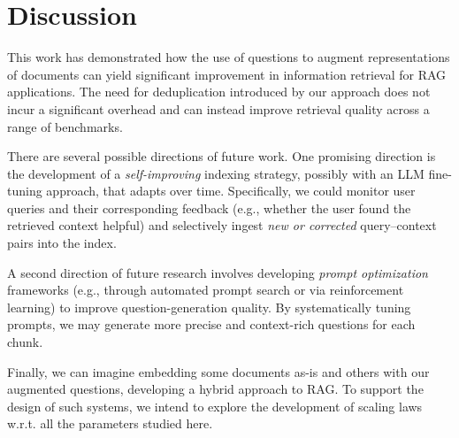 \section{Discussion}
\label{sec:discussion}
This work has demonstrated how the use of questions to augment representations of documents can yield significant improvement in information retrieval for RAG applications. The need for deduplication introduced by our approach does not incur a significant overhead and can instead improve retrieval quality across a range of benchmarks. 

There are several possible directions of future work. One promising direction is the development of a \emph{self-improving} indexing strategy, possibly with an LLM fine-tuning approach, that adapts over time. 
Specifically, we could monitor user queries and their corresponding feedback (e.g., whether the user found the retrieved context helpful) and selectively ingest \emph{new or corrected} query--context pairs into the index. 

A second direction of future research involves developing \emph{prompt optimization} frameworks (e.g., through automated prompt search or via reinforcement learning) to improve question-generation quality. 
By systematically tuning prompts, we may generate more precise and context-rich questions for each chunk. 

Finally, we can imagine embedding some documents as-is and others with our augmented questions, developing a hybrid approach to RAG. To support the design of such systems, we intend to explore the development of scaling laws w.r.t. all the parameters studied here.
%

